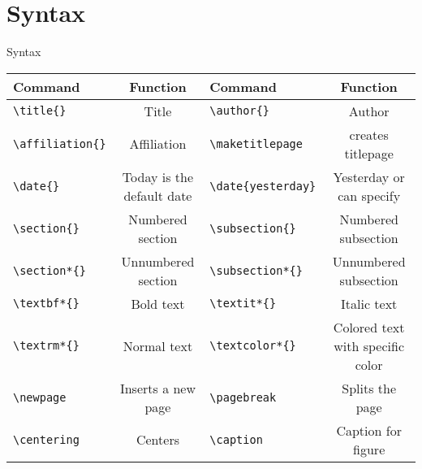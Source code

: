 

\section{Syntax}
\label{sec:introduction}
\frame[plain]{\sectionpage}


\begin{frame}{Syntax}
\begin{table}[]
    \centering
    \begin{footnotesize}
    \begin{tabular}{|l|c|l|c|}
    \hline
     Command & Function & Command & Function \\
      \hline
     \texttt{\textbackslash title\{\}} & Title & \texttt{\textbackslash author\{\}} & Author\\
     \hline
     \texttt{\textbackslash affiliation\{\}} & Affiliation & \texttt{\textbackslash maketitlepage} & creates titlepage\\
     \hline
     \texttt{\textbackslash date\{\}} & Today is the default date & \texttt{\textbackslash date\{yesterday\}} & Yesterday or can specify\\
     \hline
    \texttt{\textbackslash section\{\}} & Numbered section & \texttt{\textbackslash subsection\{\}} & Numbered subsection\\
     \hline
     \texttt{\textbackslash section*\{\}} & Unnumbered section & \texttt{\textbackslash subsection*\{\}} & Unnumbered subsection\\
     \hline
     \texttt{\textbackslash textbf*\{\}} & Bold text & \texttt{\textbackslash textit*\{\}} & Italic text\\
     \hline
     \texttt{\textbackslash textrm*\{\}} & Normal text & \texttt{\textbackslash textcolor*\{\}} & Colored text with specific color\\
     \hline
     \texttt{\textbackslash newpage} & Inserts a new page & \texttt{\textbackslash pagebreak} & Splits the page\\
     \hline
     \texttt{\textbackslash centering} & Centers & \texttt{\textbackslash caption} & Caption for figure\\

\end{tabular}
\end{footnotesize}
\end{table}
\end{frame}
